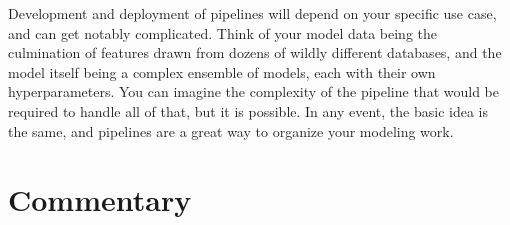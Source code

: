 \documentclass[
  letterpaper,
]{krantz}
\newenvironment{Shaded}{}{}
\newcommand{\AttributeTok}[1]{\textcolor[rgb]{0.49,0.56,0.16}{#1}}
\newcommand{\CommentTok}[1]{\textcolor[rgb]{0.38,0.63,0.69}{\textit{#1}}}
\newcommand{\DecValTok}[1]{\textcolor[rgb]{0.25,0.63,0.44}{#1}}
\newcommand{\FunctionTok}[1]{\textcolor[rgb]{0.02,0.16,0.49}{#1}}
\newcommand{\NormalTok}[1]{#1}
\newcommand{\OtherTok}[1]{\textcolor[rgb]{0.00,0.44,0.13}{#1}}
\newcommand{\SpecialCharTok}[1]{\textcolor[rgb]{0.25,0.44,0.63}{#1}}
\newcommand{\StringTok}[1]{\textcolor[rgb]{0.25,0.44,0.63}{#1}}
\begin{document}
\begin{Shaded}
\end{Shaded}

Development and deployment of pipelines will depend on your specific use
case, and can get notably complicated. Think of your model data being
the culmination of features drawn from dozens of wildly different
databases, and the model itself being a complex ensemble of models, each
with their own hyperparameters. You can imagine the complexity of the
pipeline that would be required to handle all of that, but it is
possible. In any event, the basic idea is the same, and pipelines are a
great way to organize your modeling work.

\section{Commentary}\label{commentary-3}
\end{document}
